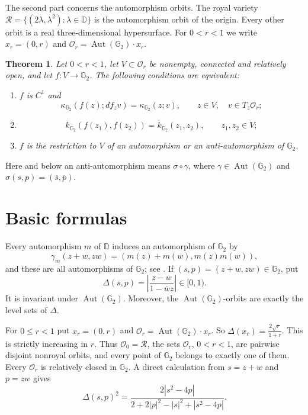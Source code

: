 \documentclass[12pt]{amsart}
\newcommand{\DD}{\mathbb D}
\newcommand{\GG}{\mathbb G_2}
\newcommand{\cR}{\mathcal R}
\newcommand{\Aut}{\operatorname{Aut}}
\newtheorem{theorem}{Theorem}
\begin{document}
The second part concerns the automorphism orbits.  The royal variety
$\cR=\{(2\lambda,\lambda^2):\lambda\in\DD\}$ is the automorphism orbit of the
origin.  Every other orbit is a real three-dimensional hypersurface.  For
$0<r<1$ we write $x_r=(0,r)$ and $\mathcal O_r=\Aut(\GG)\cdot x_r$.

\begin{theorem}\label{thm:orbit}
Let $0<r<1$, let $V\subset\mathcal O_r$ be nonempty, connected and relatively
open, and let $f:V\to\GG$. The following conditions are equivalent:
\begin{enumerate}
\item[(a)] $f$ is $C^1$ and
\[
 \kappa_{\GG}(f(z);df_zv)=\kappa_{\GG}(z;v),
 \qquad z\in V,\quad v\in T_z\mathcal O_r;
\]
\item[(b)]
\[
 k_{\GG}(f(z_1),f(z_2))=k_{\GG}(z_1,z_2),\qquad z_1,z_2\in V;
\]
\item[(c)] $f$ is the restriction to $V$ of an automorphism or an
anti-automorphism of $\GG$.
\end{enumerate}
\end{theorem}

Here and below an anti-automorphism means $\sigma\circ\gamma$, where
$\gamma\in\Aut(\GG)$ and $\sigma(s,p)=(\overline s,\overline p)$.

\section{Basic formulas}

Every automorphism $m$ of $\DD$ induces an automorphism of $\GG$ by
\[
 \gamma_m(z+w,zw)=(m(z)+m(w),m(z)m(w)),
\]
and these are all automorphisms of $\GG$; see \cite{JarnickiPflug2004}.
If $(s,p)=(z+w,zw)\in\GG$, put
\[
 \Delta(s,p)=\left|\frac{z-w}{1-\overline w z}\right|\in[0,1).
\]
It is invariant under
$\Aut(\GG)$. Moreover, the $\Aut(\GG)$-orbits are exactly the level sets of $\Delta$.

For $0\le r<1$ put $x_r=(0,r)$ and $\mathcal O_r=\Aut(\GG)\cdot x_r$. So $\Delta(x_r)=\frac{2\sqrt r}{1+r}$.
This is strictly increasing in $r$.  Thus $\mathcal O_0=\cR$, the sets $\mathcal O_r$,
$0<r<1$, are pairwise disjoint nonroyal orbits, and every point of $\GG$ belongs
to exactly one of them.  
Every $\mathcal O_r$ is relatively closed in $\GG$.
A direct calculation from $s=z+w$ and $p=zw$ gives
\begin{equation}\label{eq:Delta}
 \Delta(s,p)^2=
 \frac{2|s^2-4p|}{2+2|p|^2-|s|^2+|s^2-4p|}.
\end{equation}
\end{document}
